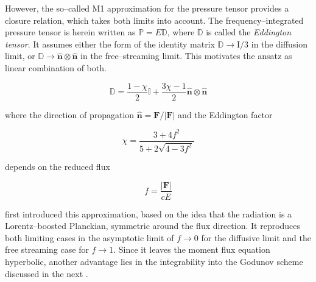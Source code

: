 However, the so--called M1 approximation for the pressure tensor provides a closure relation, which takes both limits into account.
The frequency--integrated pressure tensor is herein written as $\mathbb{P} = E\mathbb{D}$, where $\mathbb{D}$ is called the \textit{Eddington tensor}.
It assumes either the form of the identity matrix $\mathbb{D}\to\mathrm{I}/3$ in the diffusion limit, or $\mathbb{D}\to\hat{\textbf{n}}\otimes\hat{\textbf{n}}$ in the free--streaming limit.
This motivates the ansatz as linear combination of both.

\begin{equation}
  \mathbb{D} = \frac{1-\chi}{2}\mathbb{I} + \frac{3\chi-1}{2}\hat{\textbf{n}}\otimes\hat{\textbf{n}}
\end{equation}

where the direction of propagation $\hat{\textbf{n}}=\textbf{F}/\vert\textbf{F}\vert$ and the Eddington factor

\begin{equation}
  \chi = \frac{3+4f^{2}}{5+2\sqrt{4-3f^{2}}}
\end{equation}

depends on the reduced flux

\begin{equation}
  f = \frac{\vert\textbf{F}\vert}{cE}
\end{equation}

\citet{M1_approx} first introduced this approximation, based on the idea that the radiation is a Lorentz--boosted Planckian, symmetric around the flux direction.
It reproduces both limiting cases in the asymptotic limit of $f\to0$ for the diffusive limit and the free streaming case for $f\to1$.
Since it leaves the moment flux equation hyperbolic, another advantage lies in the integrability into the Godunov scheme discussed in the next .
